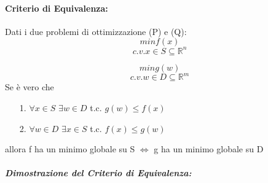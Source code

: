 \paragraph{Criterio di Equivalenza:}
Dati i due problemi di ottimizzazione (P) e (Q):
\begin{equation*}
    min f(x)
\end{equation*}
\begin{equation*}
    c.v. x \in S \subseteq \mathbb{R}^n
\end{equation*}

\begin{equation*}
    min g(w)
\end{equation*}
\begin{equation*}
    c.v. w \in D \subseteq \mathbb{R}^m
\end{equation*}
Se è vero che
\begin{itemize}
    \item[1.] $\forall x \in S$ $\exists w \in D$ t.c. $g(w) \leq f(x)$
    \item[2.] $\forall w \in D$ $\exists x \in S$ t.c. $f(x) \leq g(w)$
\end{itemize}
allora f ha un minimo globale su S $\Longleftrightarrow$ g ha un minimo globale su D

\subparagraph{Dimostrazione del Criterio di Equivalenza:} 

